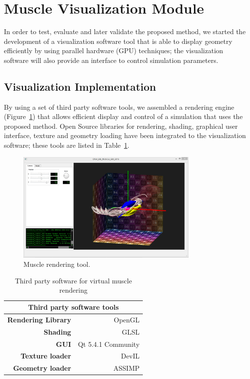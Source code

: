 \section{Muscle Visualization Module}
In order to test, evaluate and later validate the proposed method, we started the development of a visualization software tool that is able to display geometry efficiently by using parallel hardware (GPU) techniques; the visualization software will also provide an interface to control simulation parameters.


\subsection{Visualization Implementation}

By using a set of third party software tools, we assembled a rendering engine (Figure~\ref{fig:muscleVis}) that allows efficient display and control of a simulation that uses the proposed method. Open Source libraries for rendering, shading, graphical user interface, texture and geometry loading have been integrated to the visualization software; these tools are listed in Table~\ref{tab:thirdSw}.

\begin{figure}[!h]
	\centering
		\includegraphics[width=0.8\textwidth]{./Figures/viewConfig.jpg}
	\caption[Muscle rendering.]{Muscle rendering tool.}
	\label{fig:muscleVis}
\end{figure}

\begin{table}[htbp]
  \centering
  \caption{Third party software for virtual muscle rendering}
    \begin{tabular}{rr}
    \toprule
    \multicolumn{2}{c}{\textbf{Third party software tools}} \\
    \midrule
    \textbf{Rendering Library} & OpenGL \\
    \textbf{Shading} & GLSL \\
    \textbf{GUI} & Qt 5.4.1 Community \\
    \textbf{Texture loader} & DevIL \\
    \textbf{Geometry loader} & ASSIMP \\
    \bottomrule
    \end{tabular}%
  \label{tab:thirdSw}%
\end{table}%

